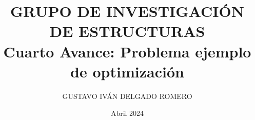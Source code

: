 \documentclass{beamer}
\title[GRUPO DE ESTRUCTURAS]{GRUPO DE INVESTIGACIÓN DE ESTRUCTURAS\\ 
Cuarto Avance: Problema ejemplo de optimización}
\author[Gustavo Delgado]{GUSTAVO IVÁN DELGADO ROMERO}
\institute[UNFV-FIC]{
  \inst{}%
  Facultad de Ingeniería Civil\\
  Universidad Nacional Federico Villarreal
}
\date{Abril 2024}
\begin{document}
\begin{frame}
    \titlepage 
\end{frame}
\end{document}
